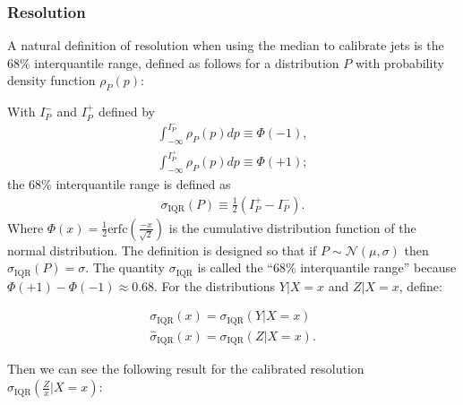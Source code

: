 \subsubsection{Resolution}
A natural definition of resolution when using the median to calibrate jets is the 68\% interquantile range, defined as follows for a distribution $P$ with probability density function $\rho_P(p)$:

\noindent With $I_P^-$ and $I_P^+$ defined by
\begin{align}
\int_{-\infty}^{I_P^-}\rho_P(p)dp \equiv \Phi(-1),\\
\int_{-\infty}^{I_P^+}\rho_P(p)dp \equiv \Phi(+1);
\end{align}
the 68\% interquantile range is defined as
\begin{align}
\sigma_\text{IQR}(P) \equiv \frac{1}{2}\left(I_P^+-I_P^-\right).
\end{align}
Where $\Phi(x)=\frac{1}{2}\text{erfc}\left(\frac{-x}{\sqrt{2}}\right)$ is the cumulative distribution function of the normal distribution. The definition is designed so that if $P\sim\mathcal{N}(\mu,\sigma)$ then $\sigma_\text{IQR}(P)=\sigma$. The quantity $\sigma_\text{IQR}$ is called the ``68\% interquantile range'' because $\Phi(+1)-\Phi(-1) \approx 0.68$.  For the distributions $Y|X=x$ and $Z|X=x$, define:

\begin{align}
\sigma_\text{IQR}(x) = \sigma_\text{IQR}(Y|X=x)\\
\hat{\sigma}_\text{IQR}(x) = \sigma_\text{IQR}(Z|X=x).
\end{align}

\noindent Then we can see the following result for the calibrated resolution $\sigma_\text{IQR}(\frac{Z}{x}|X=x)$:

\vspace{5mm}


\vspace{5mm}

